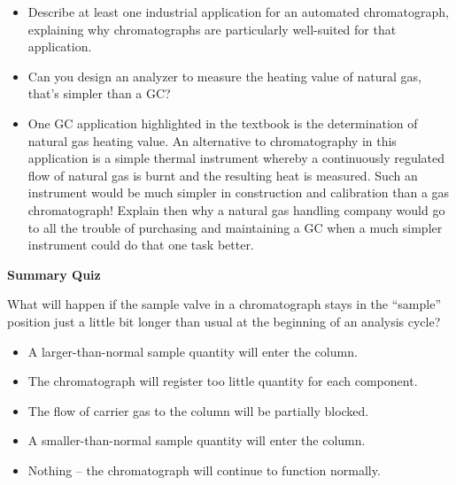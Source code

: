\begin{itemize}
\item{} Describe at least one industrial application for an automated chromatograph, explaining why chromatographs are particularly well-suited for that application.
\item{} Can you design an analyzer to measure the heating value of natural gas, that's simpler than a GC?
\item{} One GC application highlighted in the textbook is the determination of natural gas heating value.  An alternative to chromatography in this application is a simple thermal instrument whereby a continuously regulated flow of natural gas is burnt and the resulting heat is measured.  Such an instrument would be much simpler in construction and calibration than a gas chromatograph!  Explain then why a natural gas handling company would go to all the trouble of purchasing and maintaining a GC when a much simpler instrument could do that one task better.
\end{itemize}














\vfil \eject

\noindent
{\bf Summary Quiz}

What will happen if the sample valve in a chromatograph stays in the ``sample'' position just a little bit longer than usual at the beginning of an analysis cycle?

\begin{itemize}
\item{} A larger-than-normal sample quantity will enter the column.
\vskip 5pt
\item{} The chromatograph will register too little quantity for each component. 
\vskip 5pt
\item{} The flow of carrier gas to the column will be partially blocked.
\vskip 5pt
\item{} A smaller-than-normal sample quantity will enter the column.
\vskip 5pt
\item{} Nothing -- the chromatograph will continue to function normally.
\end{itemize}



